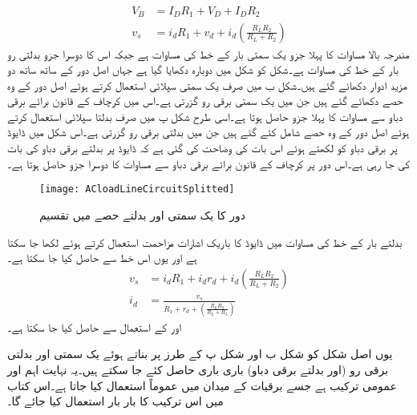 \begin{align} \label{مساوات_ٹرانزسٹر_یکسمتی_بدلتا_بار_کے_خط}
V_B&=I_D R_1 +V_D+I_D R_2\\
v_s&=i_d R_1+v_d+i_d \left (\frac{R_L R_2}{R_L+R_2} \right )
\end{align}
مندرجہ بالا مساوات کا پہلا جزو یک سمتی بار کے خط کی مساوات ہے جبکہ اس کا دوسرا جزو بدلتی رو بار کے خط کی مساوات ہے۔شکل  کو شکل  میں دوبارہ دکھایا گیا ہے جہاں اصل دور کے ساتھ ساتھ دو مزید ادوار دکھائے گئے ہیں۔شکل  ب میں صرف  یک سمتی سپلائی  استعمال کرتے ہوئے اصل دور کے وہ حصے دکھائے گئے ہیں جن میں یک سمتی برقی رو  گزرتی ہے۔اس میں کرچاف کے قانون برائے برقی دباو سے مساوات  کا پہلا جزو حاصل ہوتا ہے۔اسی طرح شکل  پ میں صرف بدلتا سپلائی  استعمال کرتے ہوئے اصل دور کے وہ حصے شامل کئے گئے ہیں جن میں بدلتی برقی رو  گزرتی ہے۔اس شکل میں ڈایوڈ پر برقی دباو کو  لکھتے ہوئے اس بات کی وضاحت کی گئی ہے کہ ڈایوڈ پر بدلتے برقی دباو کی بات کی جا رہی ہے۔اس دور پر کرچاف کے قانون برائے برقی دباو سے مساوات   کا دوسرا جزو حاصل ہوتا ہے۔
\begin{figure}
\centering
\texttt{[image: ACloadLineCircuitSplitted]}
\caption{دور کا یک سمتی اور بدلتے حصے میں تقسیم }
\label{شکل_دور_کا_یکسمتی_اور_بدلتا_حصہ}
\end{figure}
بدلتے بار کے خط کی مساوات میں ڈایوڈ کا باریک اشارات مزاحمت   استعمال کرتے ہوئے  لکھا جا سکتا ہے اور یوں اس خط سے   حاصل کیا جا سکتا ہے۔
\begin{align*}
v_s&=i_d R_1+i_d r_d + i_d \left (\frac{R_L R_2}{R_L+R_2} \right )\\
i_d&=\frac{v_s}{R_1+r_d+\left (\frac{R_L R_2}{R_L+R_2} \right )}
\end{align*}
اور   کے استعمال سے حاصل کیا جا سکتا ہے۔

یوں اصل شکل کو شکل  ب اور شکل  پ کے طرز پر بناتے ہوئے یک سمتی اور بدلتی برقی رو (اور بدلتے برقی دباو) باری باری حاصل کئے جا سکتے ہیں۔یہ نہایت اہم اور عمومی ترکیب ہے جسے برقیات کے میدان میں عموماً استعمال کیا جاتا ہے۔اس کتاب میں اس ترکیب کا بار بار استعمال کیا جائے گا۔ 

